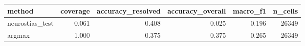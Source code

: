 \begin{tabular}{lrrrrr}
\toprule
method & coverage & accuracy_resolved & accuracy_overall & macro_f1 & n_cells \\
\midrule
neurostias_test & 0.061 & 0.408 & 0.025 & 0.196 & 26349 \\
argmax & 1.000 & 0.375 & 0.375 & 0.265 & 26349 \\
\bottomrule
\end{tabular}
